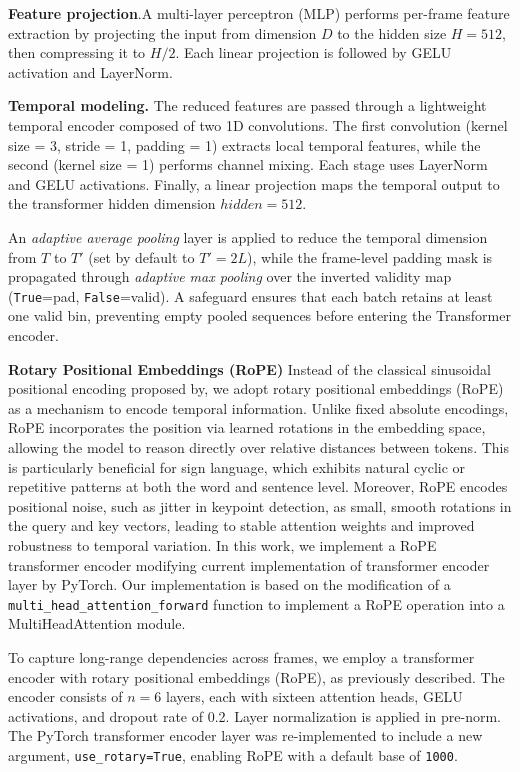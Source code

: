 \documentclass[runningheads]{llncs}
\begin{document}
\textbf{Feature projection}.A multi-layer perceptron (MLP) performs per-frame feature extraction by projecting the input from dimension \(D\) to the hidden size \(H=512\), then compressing it to \(H/2\). Each linear projection is followed by GELU activation and LayerNorm.

\textbf{Temporal modeling.} The reduced features are passed through a lightweight temporal encoder composed of two 1D convolutions. The first convolution (kernel size = 3, stride = 1, padding = 1) extracts local temporal features, while the second (kernel size = 1) performs channel mixing. Each stage uses LayerNorm and GELU activations. Finally, a linear projection maps the temporal output to the transformer hidden dimension \(hidden=512\).
  
An \emph{adaptive average pooling} layer is applied to reduce the temporal dimension from $T$ to $T'$ (set by default to $T' = 2L$), while the frame-level padding mask is propagated through \emph{adaptive max pooling} over the inverted validity map (\texttt{True}=pad, \texttt{False}=valid). A safeguard ensures that each batch retains at least one valid bin, preventing empty pooled sequences before entering the Transformer encoder.

\textbf{Rotary Positional Embeddings (RoPE)}
Instead of the classical sinusoidal positional encoding proposed by\cite{vaswani2023attentionneed}, we adopt rotary positional embeddings (RoPE) \cite{su2023roformerenhancedtransformerrotary} as a mechanism to encode temporal information. Unlike fixed absolute encodings, RoPE incorporates the position via learned rotations in the embedding space, allowing the model to reason directly over relative distances between tokens. This is particularly beneficial for sign language, which exhibits natural cyclic or repetitive patterns at both the word and sentence level. Moreover, RoPE encodes positional noise, such as jitter in keypoint detection, as small, smooth rotations in the query and key vectors, leading to stable attention weights and improved robustness to temporal variation.
In this work, we implement a RoPE transformer encoder modifying current implementation of transformer encoder layer by PyTorch. Our implementation is based on the modification of a \texttt{multi\_head\_attention\_forward} function to implement a RoPE operation into a MultiHeadAttention module.
    
To capture long-range dependencies across frames, we employ a transformer encoder with rotary positional embeddings (RoPE), as previously described. The encoder consists of \(n = 6\) layers, each with sixteen attention heads, GELU activations, and dropout rate of 0.2. Layer normalization is applied in pre-norm. The PyTorch transformer encoder layer was re-implemented to include a new argument, \texttt{use\_rotary=True}, enabling RoPE with a default base of \texttt{1000}.
\end{document}
